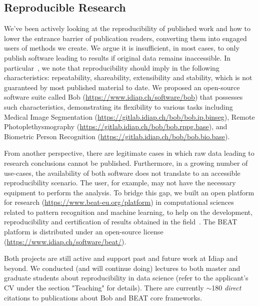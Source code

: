 \documentclass[11pt,a4paper,sans]{moderncv}
\begin{document}
\subsection{Reproducible Research}

We've been actively looking at the reproducibility of published work and how to
lower the entrance barrier of publication readers, converting them into engaged
users of methods we create.  We argue it is insufficient, in most cases, to
only publish software leading to results if original data remains inaccessible.
In particular~\cite{acmmm-2012}, we note that reproducibility should imply
in the following characteristics: repeatability, shareability, extensibility
and stability, which is not guaranteed by most published material to date.  We
proposed an open-source software suite called Bob
(\url{https://www.idiap.ch/software/bob}) that possesses such characteristics,
demonstrating its flexibility to various tasks including Medical Image
Segmentation (\url{https://gitlab.idiap.ch/bob/bob.ip.binseg}), Remote
Photoplethysmography (\url{https://gitlab.idiap.ch/bob/bob.rppg.base}), and
Biometric Person Recognition (\url{https://gitlab.idiap.ch/bob/bob.bio.base}).

From another perspective, there are legitimate cases in which raw data leading
to research conclusions cannot be published.  Furthermore, in a growing number
of use-cases, the availability of both software does not translate to an
accessible reproducibility scenario.  The user, for example, may not have the
necessary equipment to perform the analysis.  To bridge this gap, we built an
open platform for research (\url{https://www.beat-eu.org/platform}) in
computational sciences related to pattern recognition and machine learning, to
help on the development, reproducibility and certification of results obtained
in the field~\cite{icml-2017-1}.  The BEAT platform is distributed under an
open-source license (\url{https://www.idiap.ch/software/beat/}).

Both projects are still active and support past and future work at Idiap and
beyond.  We conducted (and will continue doing) lectures to both master and
graduate students about reproducibility in data science (refer to the
applicant's CV under the section "Teaching" for details).  There are currently
$\sim$180 \textit{direct} citations to publications about Bob and BEAT core
frameworks.
\end{document}
